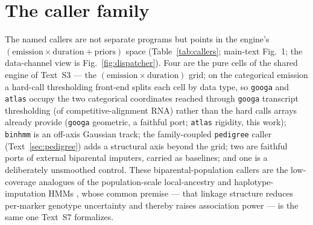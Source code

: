 \documentclass[11pt]{article}
\providecommand{\googa}{\texttt{googa}\xspace}
\providecommand{\atlas}{\texttt{atlas}\xspace}
\providecommand{\binhmm}{\texttt{binhmm}\xspace}
\providecommand{\pedigree}{\texttt{pedigree}\xspace}
\begin{document}
\section{The caller family}
\label{sec:callers}

The named callers are not separate programs but points in the engine's
$(\text{emission}\times\text{duration}+\text{priors})$ space
(Table~\ref{tab:callers}; main-text Fig.~1; the data-channel view is Fig.~\ref{fig:dispatcher}). Four are the pure cells of the shared engine of
Text~S3 --- the $(\text{emission}\times\text{duration})$ grid; on the categorical emission a
hard-call thresholding front-end splits each cell by data type, so \googa and \atlas occupy the two
categorical coordinates reached through \googa transcript thresholding (of competitive-alignment RNA)
rather than the hard calls arrays already provide (\googa geometric, a faithful port; \atlas rigidity, this
work); \binhmm is an off-axis Gaussian
track; the family-coupled \pedigree caller (Text~\ref{sec:pedigree}) adds a structural axis beyond the
grid; two are faithful ports of external biparental imputers, carried as baselines; and one is a
deliberately unsmoothed control. These biparental-population callers are the
low-coverage analogues of the population-scale local-ancestry and haplotype-imputation
HMMs \citep{falush_2003,hapmix_2009,rfmix_2013,ancestryhmm_2017,mosaic_2019,mach_2010,beagle_2007,stitch_2016,glimpse_2021},
whose common premise --- that linkage structure reduces per-marker genotype
uncertainty and thereby raises association power \citep{marchini_howie_2010} --- is
the same one Text~S7 formalizes.
\end{document}
